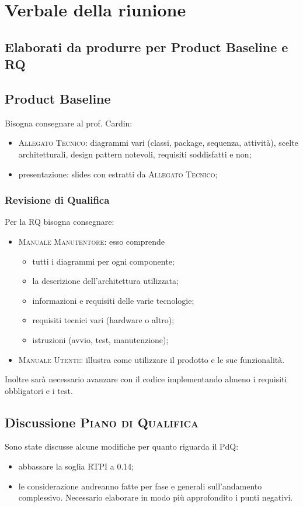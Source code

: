 \section{Verbale della riunione}

\subsection{ Elaborati da produrre per Product Baseline e RQ}
\subsection{Product Baseline}
Bisogna consegnare al prof. Cardin:
\begin{itemize}
	\item \textsc{Allegato Tecnico}: diagrammi vari (classi, package, sequenza, attività), scelte architetturali, design pattern notevoli, requisiti soddisfatti e non;
	\item presentazione: slides con estratti da \textsc{Allegato Tecnico};
\end{itemize}

\subsubsection{Revisione di Qualifica}
Per la RQ bisogna consegnare:
\begin{itemize}
	\item \textsc{Manuale Manutentore}: esso comprende 
	\begin{itemize}
		\item tutti i diagrammi per ogni componente;
		\item la descrizione dell'architettura utilizzata;
		\item informazioni e requisiti delle varie tecnologie;
		\item requisiti tecnici vari (hardware o altro);
		\item istruzioni (avvio, test, manutenzione);
	\end{itemize}
	\item \textsc{Manuale Utente}: illustra come utilizzare il prodotto e le sue funzionalità.
\end{itemize}
Inoltre sarà necessario avanzare con il codice implementando almeno i requisiti obbligatori e i test.


\subsection{Discussione \textsc{Piano di Qualifica}}
Sono state discusse alcune modifiche per quanto riguarda il PdQ:
\begin{itemize}
	\item abbassare la soglia RTPI a 0.14;
	\item le considerazione andreanno fatte per fase e generali sull'andamento complessivo. Necessario elaborare in modo più approfondito i punti negativi.
\end{itemize}

